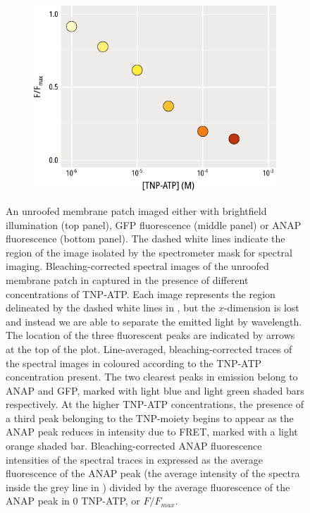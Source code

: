 \begin{figure}[hbtp]
\begin{subfigure}[t]{0.45\textwidth}
	\end{subfigure}
	\hfill
	\begin{subfigure}[t]{0.45\textwidth}
		\caption{}\label{ch3fig:unroofed_intensities}
		\centering
		\includegraphics[width=\textwidth]{unroofed_intensities.pdf}
	\end{subfigure}
	\caption[Unroofed membranes spectral images]{
	 An unroofed membrane patch imaged either with brightfield illumination (top panel), GFP fluorescence (middle panel) or ANAP fluorescence (bottom panel).
	The dashed white lines indicate the region of the image isolated by the spectrometer mask for spectral imaging.
	 Bleaching-corrected spectral images of the unroofed membrane patch in  captured in the presence of different concentrations of TNP-ATP.
	Each image represents the region delineated by the dashed white lines in , but the $x$-dimension is lost and instead we are able to separate the emitted light by wavelength.
	The location of the three fluorescent peaks are indicated by arrows at the top of the plot.
	 Line-averaged, bleaching-corrected traces of the spectral images in  coloured according to the TNP-ATP concentration present.
	The two clearest peaks in emission belong to ANAP and GFP, marked with light blue and light green shaded bars respectively.
	At the higher TNP-ATP concentrations, the presence of a third peak belonging to the TNP-moiety begins to appear as the ANAP peak reduces in intensity due to FRET, marked with a light orange shaded bar.
	 Bleaching-corrected ANAP fluorescence intensities of the spectral traces in  expressed as the average fluorescence of the ANAP peak (the average intensity of the spectra inside the grey line in ) divided by the average fluorescence of the ANAP peak in $0$ TNP-ATP, or $F/F_{max}$.
	}
\end{figure}

